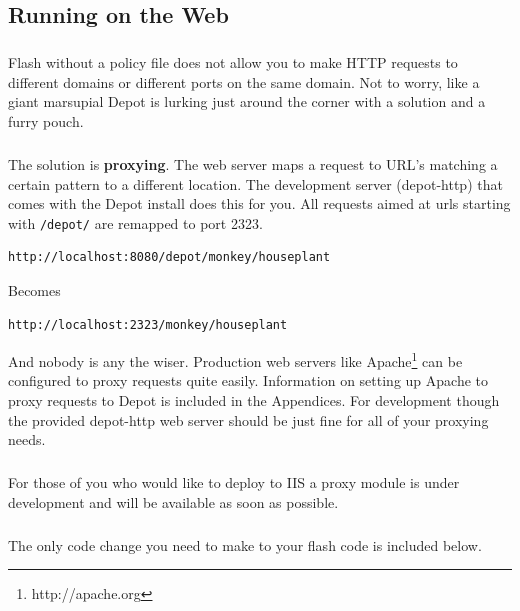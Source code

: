 \documentclass[12pt]{report}
\begin{document}
\begin{appendices}


\chapter{Running on the Web}
\label{web.proxy}

\paragraph{}
Flash without a policy file does not allow you to
make HTTP requests to different domains or different ports on the same
domain. Not to worry, like a giant marsupial Depot is lurking just
around the corner with a solution and a furry pouch.
\paragraph{}
The solution is \textbf{proxying}. The web server maps a request to
URL's matching a certain pattern to a different location. The
development server (depot-http) that comes with the Depot install does
this for you. All requests aimed at urls starting with
\texttt{/depot/} are remapped to port 2323.

\begin{Verbatim}[frame=single]
http://localhost:8080/depot/monkey/houseplant
\end{Verbatim}

Becomes 

\begin{Verbatim}[frame=single]
http://localhost:2323/monkey/houseplant
\end{Verbatim}

And nobody is any the wiser. Production web servers like
Apache\footnote{http://apache.org} can be configured to proxy requests
quite easily. Information on setting up Apache to proxy requests to
Depot is included in the Appendices. For development though the
provided depot-http web server should be just fine for all of your
proxying needs.

\paragraph{}
For those of you who would like to deploy to IIS a proxy module is
under development and will be available as soon as possible. 

\paragraph{}
The only code change you need to make to your flash code is included below. 


\end{appendices}
\end{document}
